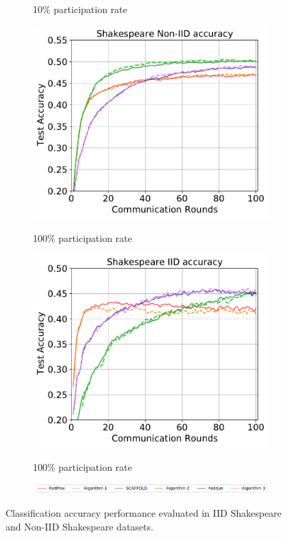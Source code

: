 \documentclass{article} %
\begin{document}
\begin{figure}[ht!]
\begin{subfigure}{.5\textwidth}
  \label{fig:sub-2}
  \caption{10\% participation rate}
\end{subfigure}
\begin{subfigure}{.5\textwidth}
  \centering
  \includegraphics[width=.8\linewidth]{100perfig/Shakespeare_noniid.pdf}
  \label{fig:sub-4}
  \caption{100\% participation rate}
\end{subfigure}
\begin{subfigure}{.5\textwidth}
  \centering
  \includegraphics[width=.8\linewidth]{100perfig/Shakespeare_iid.pdf}
  \label{fig:sub-5}
  \caption{100\% participation rate}
\end{subfigure}
\begin{subfigure}{1\textwidth}
  \centering
  \includegraphics[width=1\linewidth]{textfigure/legend.pdf}
  \label{fig:sub-3}
\end{subfigure}
\caption{Classification accuracy performance evaluated in IID Shakespeare and Non-IID Shakespeare datasets.}
\label{fig:Shakespeare 10 accuracy}
\end{figure}
\end{document}
